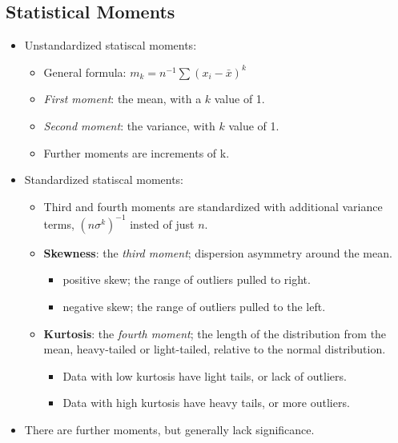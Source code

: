\documentclass[12pt,a4paper]{article}
\begin{document}
\subsection{Statistical Moments}
\begin{itemize}
    \item Unstandardized statiscal moments:
        \begin{itemize}
            \item General formula: {\color{o-Sun}\(m_k = n^{-1}\sum(x_i-\bar{x})^k\)}
            \item \textit{First moment}: the {\color{o-Sun}mean}, with a \(k\) value of 1.
            \item \textit{Second moment}: the {\color{o-Sun}variance}, with \(k\) value of 1.
            \item Further moments are increments of k.
        \end{itemize}
    \item Standardized statiscal moments:
        \begin{itemize}
            \item Third and fourth moments are standardized with additional variance terms, {\color{o-Sun}\((n\sigma^k)^{-1}\)} insted of just \(n\).
            \item \textbf{Skewness}: the \textit{third moment}; dispersion asymmetry around the mean.
                \begin{itemize}
                    \item {\color{pos}positive skew}; the range of outliers pulled to right.
                    \item {\color{neg}negative skew}; the range of outliers pulled to the left. 
                \end{itemize}
            \item \textbf{Kurtosis}: the \textit{fourth moment}; the length of the distribution from the mean, heavy-tailed or light-tailed, relative to the normal distribution.
                \begin{itemize}
                    \item Data with {\color{o-Sun}low} kurtosis have light tails, or {\color{o-Sun}lack of outliers}.
                    \item Data with {\color{o-Sun}high} kurtosis have heavy tails, or {\color{o-Sun}more outliers}.
                \end{itemize}
        \end{itemize}
    \item There are further moments, but generally lack significance.

\end{itemize}
\end{document}
